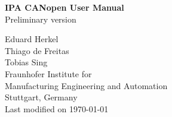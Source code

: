 \begin{titlepage}
\vspace*{13mm}
\begin{center}
  \vspace{10mm} 
         {\Large \bf IPA CANopen User Manual\\}
  \vspace{3mm}
         {  Preliminary version\\}
              

  \vspace{80mm}
  \vspace{5mm}
         {\large Eduard Herkel} \\
	 {\large Thiago de Freitas}\\
	 {\large Tobias Sing}\\
  \vspace{5mm}
         {\large Fraunhofer Institute for}\\
         {\large Manufacturing Engineering and Automation} \\
         \vspace{5mm}
         {\large Stuttgart, Germany} \\
  \vfill
         {\large Last modified on \today}
\end{center}
\end{titlepage}

\clearpage
\thispagestyle{empty}
\cleardoublepage
